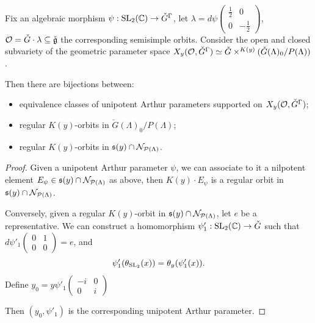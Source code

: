\begin{thm}
  Fix an algebraic morphism $\psi : \operatorname{SL}_2(\mathbb{C}) \to \check{G}^{\Gamma}$, let $\lambda = d\psi \begin{pmatrix} \frac{1}{2} & 0 \\ 0 & -\frac{1}{2} \end{pmatrix}$, $\mathcal{O} = \check{G} \cdot \lambda \subseteq \check{\mathfrak{g}}$ the corresponding semisimple orbits.
  Consider the open and closed subvariety of the geometric parameter space $X_y(\mathcal{O},\check{G}^{\Gamma}) \simeq \check{G} \times^{K(y)} (\check{G}(\Lambda)_0/P(\Lambda))$.

  Then there are bijections between:
  \begin{itemize}
    \item equivalence classes of unipotent Arthur parameters supported on $X_y(\mathcal{O},\check{G}^{\Gamma})$;
    \item regular $K(y)$-orbits in $\check{G}(\Lambda)_0/P(\Lambda)$;
    \item regular $K(y)$-orbits in $\mathfrak{s}(y) \cap \mathcal{N}_{\mathcal{P}(\Lambda)}$.
  \end{itemize}

\end{thm}

\begin{proof}
  Given a unipotent Arthur parameter $\psi$, we can associate to it a nilpotent element $E_{\psi} \in \mathfrak{s}(y) \cap \mathcal{N}_{\mathcal{P}(\Lambda)}$ as above, then $K(y) \cdot E_\psi$ is a regular orbit in $\mathfrak{s}(y) \cap \mathcal{N}_{\mathcal{P}(\Lambda)}$.

  Conversely, given a regular $K(y)$-orbit in $\mathfrak{s}(y) \cap \mathcal{N}_{\mathcal{P}(\Lambda)}$, let $e$ be a representative. We can construct a homomorphism $\psi'_1 : \operatorname{SL}_2(\mathbb{C}) \to \check{G}$ such that $d\psi'_1 \begin{pmatrix} 0 & 1 \\ 0 & 0 \end{pmatrix} = e$, and \[\psi'_1(\theta_{\operatorname{SL}_2}(x)) = \theta_y(\psi'_1(x)).\]
  Define $y_0 = y \psi'_1\begin{pmatrix}
  -i & 0 \\ 0 & i
  \end{pmatrix}$

  Then $(y_0,\psi'_1)$ is the corresponding unipotent Arthur parameter.
\end{proof}


